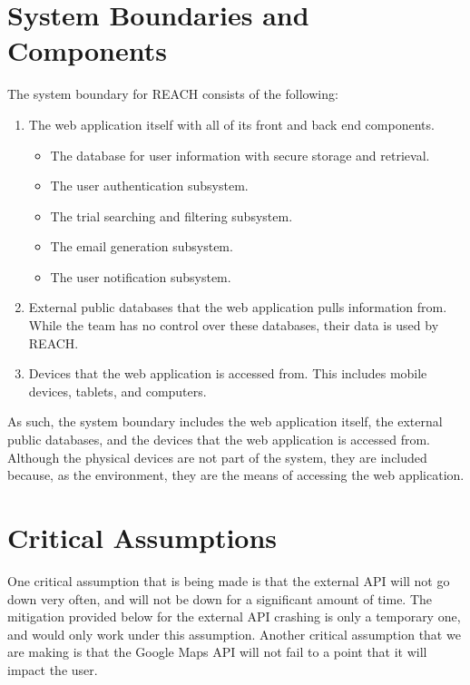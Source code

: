 \documentclass{article}
\begin{document}
\section{System Boundaries and Components}
The system boundary for REACH consists of the following:
\begin{enumerate}
    \item The web application itself with all of its front and back end components.
    \begin{itemize}
        \item The database for user information with secure storage and retrieval.
        \item The user authentication subsystem.
        \item The trial searching and filtering subsystem.
        \item The email generation subsystem.
        \item The user notification subsystem.
    \end{itemize}
    \item External public databases that the web application pulls information from. 
    While the team has no control over these databases, their data is used by REACH.
    \item Devices that the web application is accessed from.
    This includes mobile devices, tablets, and computers.
\end{enumerate}

As such, the system boundary 
includes the web application itself, the external public databases, 
and the devices that the web application is accessed from.
Although the physical devices are not part of the system, 
they are included because, as the environment, they are the means of accessing the web application.



\section{Critical Assumptions}

One critical assumption that is being made is that the external API will not go down very often, and will not be down for a significant amount 
of time. The mitigation provided below for the external API crashing is only a temporary one, and would only work under this assumption. Another critical 
assumption that we are making is that the Google Maps API will not fail to a point that it will impact the user.
\end{document}
